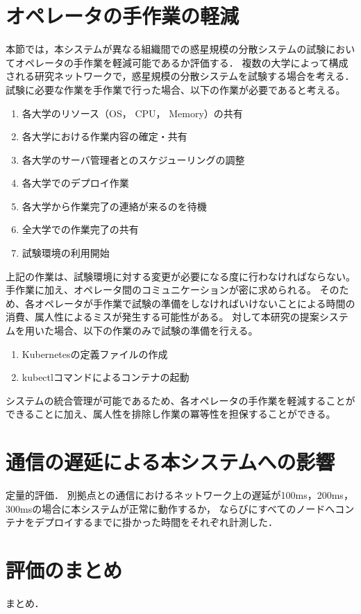 \section{オペレータの手作業の軽減}

本節では，本システムが異なる組織間での惑星規模の分散システムの試験においてオペレータの手作業を軽減可能であるか評価する．
複数の大学によって構成される研究ネットワークで，惑星規模の分散システムを試験する場合を考える．
試験に必要な作業を手作業で行った場合、以下の作業が必要であると考える。

\begin{enumerate}
  \item 各大学のリソース（OS， CPU， Memory）の共有
  \item 各大学における作業内容の確定・共有
  \item 各大学のサーバ管理者とのスケジューリングの調整
  \item 各大学でのデプロイ作業
  \item 各大学から作業完了の連絡が来るのを待機
  \item 全大学での作業完了の共有
  \item 試験環境の利用開始
\end{enumerate}

上記の作業は、試験環境に対する変更が必要になる度に行わなければならない。
手作業に加え、オペレータ間のコミュニケーションが密に求められる。
そのため、各オペレータが手作業で試験の準備をしなければいけないことによる時間の消費、属人性によるミスが発生する可能性がある。
対して本研究の提案システムを用いた場合、以下の作業のみで試験の準備を行える。

\begin{enumerate}
  \item Kubernetesの定義ファイルの作成
  \item kubectlコマンドによるコンテナの起動
\end{enumerate}

システムの統合管理が可能であるため、各オペレータの手作業を軽減することができることに加え、属人性を排除し作業の冪等性を担保することができる。

\section{通信の遅延による本システムへの影響}

定量的評価．
別拠点との通信におけるネットワーク上の遅延が100ms，200ms，300msの場合に本システムが正常に動作するか，
ならびにすべてのノードへコンテナをデプロイするまでに掛かった時間をそれぞれ計測した．

\section{評価のまとめ}

まとめ．

